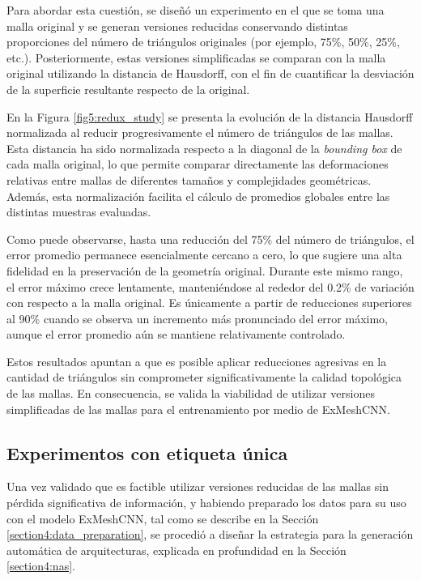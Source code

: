 Para abordar esta cuestión, se diseñó un experimento en el que se toma una malla original y se generan versiones reducidas conservando distintas proporciones del número de triángulos originales (por ejemplo, 75\%, 50\%, 25\%, etc.). Posteriormente, estas versiones simplificadas se comparan con la malla original utilizando la distancia de Hausdorff, con el fin de cuantificar la desviación de la superficie resultante respecto de la original.

En la Figura \ref{fig5:redux_study} se presenta la evolución de la distancia Hausdorff normalizada al reducir progresivamente el número de triángulos de las mallas. Esta distancia ha sido normalizada respecto a la diagonal de la \textit{bounding box} de cada malla original, lo que permite comparar directamente las deformaciones relativas entre mallas de diferentes tamaños y complejidades geométricas. Además, esta normalización facilita el cálculo de promedios globales entre las distintas muestras evaluadas.

Como puede observarse, hasta una reducción del 75\% del número de triángulos, el error promedio permanece esencialmente cercano a cero, lo que sugiere una alta fidelidad en la preservación de la geometría original. Durante este mismo rango, el error máximo crece lentamente, manteniéndose al rededor del 0.2\% de variación con respecto a la malla original. Es únicamente a partir de reducciones superiores al 90\% cuando se observa un incremento más pronunciado del error máximo, aunque el error promedio aún se mantiene relativamente controlado.

Estos resultados apuntan a que es posible aplicar reducciones agresivas en la cantidad de triángulos sin comprometer significativamente la calidad topológica de las mallas. En consecuencia, se valida la viabilidad de utilizar versiones simplificadas de las mallas para el entrenamiento por medio de ExMeshCNN.

\subsection{Experimentos con etiqueta única}
Una vez validado que es factible utilizar versiones reducidas de las mallas sin pérdida significativa de información, y habiendo preparado los datos para su uso con el modelo ExMeshCNN, tal como se describe en la Sección \ref{section4:data_preparation}, se procedió a diseñar la estrategia para la generación automática de arquitecturas, explicada en profundidad en la Sección \ref{section4:nas}.

